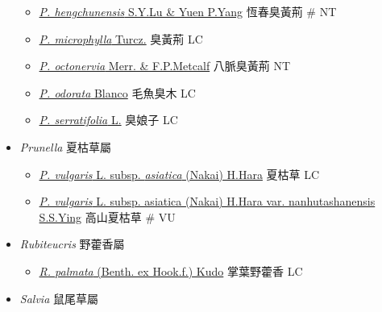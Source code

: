 \begin{itemize}
  \begin{itemize}
        \item[] \href{http://www.theplantlist.org/tpl1.1/search?q=Premna+hengchunensis}{\textit{P. hengchunensis} S.Y.Lu \& Yuen P.Yang}   恆春臭黃荊  \# NT
        \item[] \href{http://www.theplantlist.org/tpl1.1/search?q=Premna+microphylla}{\textit{P. microphylla} Turcz.}   臭黃荊   LC
        \item[] \href{http://www.theplantlist.org/tpl1.1/search?q=Premna+octonervia}{\textit{P. octonervia} Merr. \& F.P.Metcalf}   八脈臭黃荊   NT
        \item[] \href{http://www.theplantlist.org/tpl1.1/search?q=Premna+odorata}{\textit{P. odorata} Blanco}   毛魚臭木   LC
        \item[] \href{http://www.theplantlist.org/tpl1.1/search?q=Premna+serratifolia}{\textit{P. serratifolia} L.}   臭娘子   LC
  \end{itemize}
 \item[] \textit{Prunella} 夏枯草屬
                                
  \begin{itemize}
        \item[] \href{http://www.theplantlist.org/tpl1.1/search?q=Prunella+vulgaris+subsp.+asiatica}{\textit{P. vulgaris} L. subsp. \textit{asiatica} (Nakai) H.Hara}   夏枯草   LC
        \item[] \href{http://www.theplantlist.org/tpl1.1/search?q=Prunella+vulgaris+subsp.+asiatica+var.+nanhutashanensis}{\textit{P. vulgaris} L. subsp. asiatica (Nakai) H.Hara var. nanhutashanensis S.S.Ying}   高山夏枯草  \# VU
  \end{itemize}
 \item[] \textit{Rubiteucris} 野藿香屬
                                
  \begin{itemize}
        \item[] \href{http://www.theplantlist.org/tpl1.1/search?q=Rubiteucris+palmata}{\textit{R. palmata} (Benth. ex Hook.f.) Kudo}   掌葉野藿香   LC
  \end{itemize}
 \item[] \textit{Salvia} 鼠尾草屬
                                

\end{itemize}
